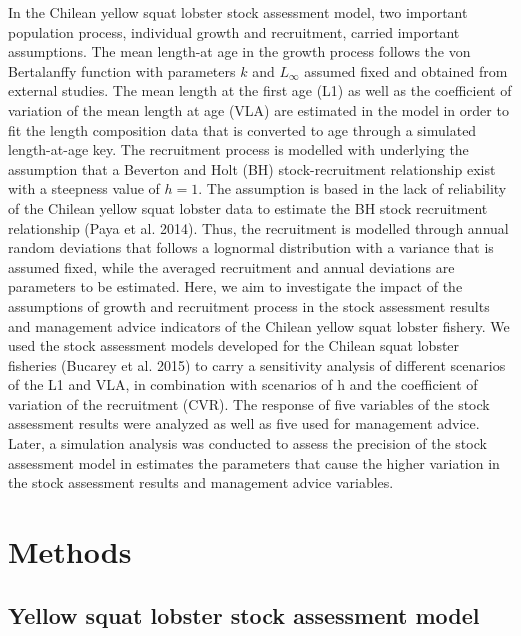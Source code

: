 \documentclass[11pt,letterpaper,]{article}
\begin{document}
In the Chilean yellow squat lobster stock assessment model, two
important population process, individual growth and recruitment, carried
important assumptions. The mean length-at age in the growth process
follows the von Bertalanffy function with parameters \(k\) and
\(L_{\infty}\) assumed fixed and obtained from external studies. The
mean length at the first age (L1) as well as the coefficient of
variation of the mean length at age (VLA) are estimated in the model in
order to fit the length composition data that is converted to age
through a simulated length-at-age key. The recruitment process is
modelled with underlying the assumption that a Beverton and Holt (BH)
stock-recruitment relationship exist with a steepness value of \(h=1\).
The assumption is based in the lack of reliability of the Chilean yellow
squat lobster data to estimate the BH stock recruitment relationship
(Paya et al. 2014). Thus, the recruitment is modelled through annual
random deviations that follows a lognormal distribution with a variance
that is assumed fixed, while the averaged recruitment and annual
deviations are parameters to be estimated. Here, we aim to investigate
the impact of the assumptions of growth and recruitment process in the
stock assessment results and management advice indicators of the Chilean
yellow squat lobster fishery. We used the stock assessment models
developed for the Chilean squat lobster fisheries (Bucarey et al. 2015)
to carry a sensitivity analysis of different scenarios of the L1 and
VLA, in combination with scenarios of h and the coefficient of variation
of the recruitment (CVR). The response of five variables of the stock
assessment results were analyzed as well as five used for management
advice. Later, a simulation analysis was conducted to assess the
precision of the stock assessment model in estimates the parameters that
cause the higher variation in the stock assessment results and
management advice variables.

\section{Methods}\label{methods}

\subsection{Yellow squat lobster stock assessment
model}\label{yellow-squat-lobster-stock-assessment-model}
\end{document}
